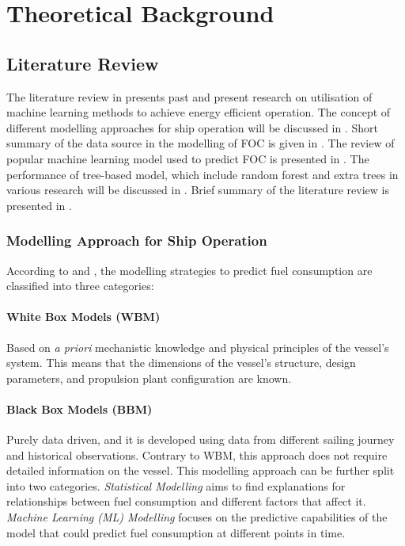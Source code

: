 \chapter{Theoretical Background}\label{chp:theory}

\section{Literature Review}\label{sec:litreview}

The literature review in  presents past and present research on utilisation of machine learning methods to achieve energy efficient operation. The concept of different modelling approaches for ship operation will be discussed in . Short summary of the data source in the modelling of FOC is given in . The review of popular machine learning model used to predict FOC is presented in . The performance of tree-based model, which include random forest and extra trees in various research will be discussed in . Brief summary of the literature review is presented in .\\

\subsection{Modelling Approach for Ship Operation}\label{sec:modelling_type}

According to  and , the modelling strategies to predict fuel consumption are classified into three categories:\\

\subsubsection*{\textbf{White Box Models (WBM)}} Based on \emph{a priori} mechanistic knowledge and physical principles of the vessel's system. This means that the dimensions of the vessel's structure, design parameters, and propulsion plant configuration are known.\\

\subsubsection*{\textbf{Black Box Models (BBM)}} Purely data driven, and it is developed using data from different sailing journey and historical observations. Contrary to WBM, this approach does not require detailed information on the vessel. This modelling approach can be further split into two categories. \emph{Statistical Modelling} aims to find explanations for relationships between fuel consumption and different factors that affect it. \emph{Machine Learning (ML) Modelling} focuses on the predictive capabilities of the model that could predict fuel consumption at different points in time.\\


